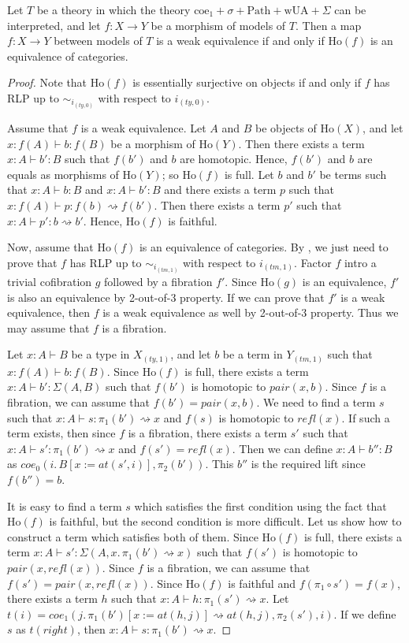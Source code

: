 \documentclass{mscs}
\newcommand{\repl}{:=}
\newcommand{\wUA}{\mathrm{wUA}}
\newcommand{\coeT}{\mathrm{coe}}
\newcommand{\PathT}{\mathrm{Path}}
\newcommand{\Ho}{\mathrm{Ho}}
\newcommand{\refl}{\mathit{refl}}
\newcommand{\rightI}{\mathit{right}}
\newcommand{\coe}{\mathit{coe}}
\newcommand{\idtype}{\rightsquigarrow}
\newcommand{\at}{\mathit{at}}
\newcommand{\pair}{\mathit{pair}}
\numberwithin{figure}{section}
\begin{document}
\begin{prop}[sigma-we-ho]
Let $T$ be a theory in which the theory $\coeT_1 + \sigma + \PathT + \wUA + \Sigma$ can be interpreted, and let $f : X \to Y$ be a morphism of models of $T$.
Then a map $f : X \to Y$ between models of $T$ is a weak equivalence if and only if $\Ho(f)$ is an equivalence of categories.
\end{prop}
\begin{proof}
Note that $\Ho(f)$ is essentially surjective on objects if and only if $f$ has RLP up to $\sim_{i_{(ty,0)}}$ with respect to $i_{(ty,0)}$.

Assume that $f$ is a weak equivalence.
Let $A$ and $B$ be objects of $\Ho(X)$, and let $x : f(A) \vdash b : f(B)$ be a morphism of $\Ho(Y)$.
Then there exists a term $x : A \vdash b' : B$ such that $f(b')$ and $b$ are homotopic.
Hence, $f(b')$ and $b$ are equals as morphisms of $\Ho(Y)$; so $\Ho(f)$ is full.
Let $b$ and $b'$ be terms such that $x : A \vdash b : B$ and $x : A \vdash b' : B$ and there exists a term $p$ such that $x : f(A) \vdash p : f(b) \idtype f(b')$.
Then there exists a term $p'$ such that $x : A \vdash p' : b \idtype b'$.
Hence, $\Ho(f)$ is faithful.

Now, assume that $\Ho(f)$ is an equivalence of categories.
By , we just need to prove that $f$ has RLP up to $\sim_{i_{(tm,1)}}$ with respect to $i_{(tm,1)}$.
Factor $f$ intro a trivial cofibration $g$ followed by a fibration $f'$.
Since $\Ho(g)$ is an equivalence, $f'$ is also an equivalence by 2-out-of-3 property.
If we can prove that $f'$ is a weak equivalence, then $f$ is a weak equivalence as well by 2-out-of-3 property.
Thus we may assume that $f$ is a fibration.

Let $x : A \vdash B$ be a type in $X_{(ty,1)}$, and let $b$ be a term in $Y_{(tm,1)}$ such that $x : f(A) \vdash b : f(B)$.
Since $\Ho(f)$ is full, there exists a term $x : A \vdash b' : \Sigma(A,B)$ such that $f(b')$ is homotopic to $\pair(x,b)$.
Since $f$ is a fibration, we can assume that $f(b') = \pair(x,b)$.
We need to find a term $s$ such that $x : A \vdash s : \pi_1(b') \idtype x$ and $f(s)$ is homotopic to $\refl(x)$.
If such a term exists, then since $f$ is a fibration, there exists a term $s'$ such that $x : A \vdash s' : \pi_1(b') \idtype x$ and $f(s') = \refl(x)$.
Then we can define $x : A \vdash b'' : B$ as $\coe_0(i.\,B[x \repl \at(s',i)], \pi_2(b'))$.
This $b''$ is the required lift since $f(b'') = b$.

It is easy to find a term $s$ which satisfies the first condition using the fact that $\Ho(f)$ is faithful, but the second condition is more difficult.
Let us show how to construct a term which satisfies both of them.
Since $\Ho(f)$ is full, there exists a term $x : A \vdash s' : \Sigma(A, x.\,\pi_1(b') \idtype x)$ such that $f(s')$ is homotopic to $\pair(x, \refl(x))$.
Since $f$ is a fibration, we can assume that $f(s') = \pair(x, \refl(x))$.
Since $\Ho(f)$ is faithful and $f(\pi_1 \circ s') = f(x)$, there exists a term $h$ such that $x : A \vdash h : \pi_1(s') \idtype x$.
Let $t(i) = \coe_1(j.\,\pi_1(b')[x \repl \at(h,j)] \idtype \at(h,j), \pi_2(s'), i)$.
If we define $s$ as $t(\rightI)$, then $x : A \vdash s : \pi_1(b') \idtype x$.


\end{proof}
\end{document}
